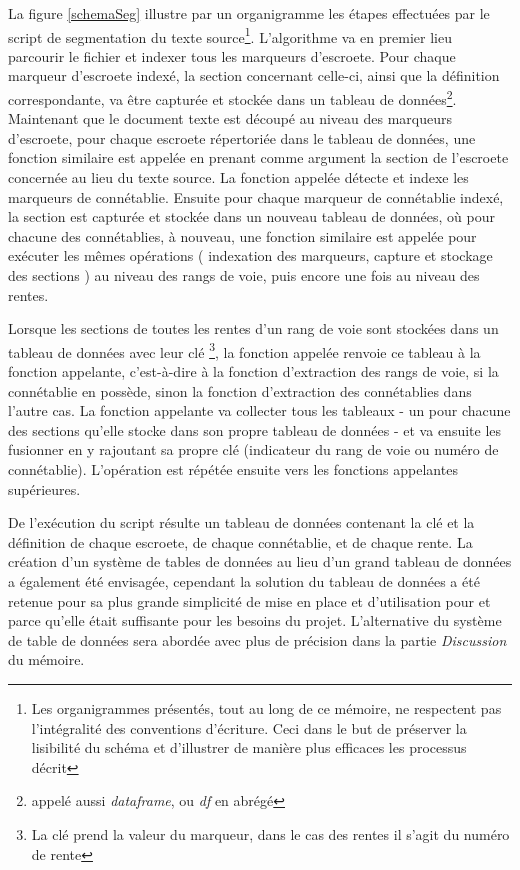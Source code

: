 La figure \ref{schemaSeg} illustre par un organigramme les étapes effectuées par le script de segmentation du texte source\footnote{Les organigrammes présentés, tout au long de ce mémoire, ne respectent pas l'intégralité des conventions d'écriture. Ceci dans le but de préserver la lisibilité du schéma et d'illustrer de manière plus efficaces les processus décrit}.
L’algorithme va en premier lieu parcourir le fichier et indexer tous les marqueurs d'escroete. Pour chaque marqueur d'escroete indexé, la section concernant celle-ci, ainsi que la définition correspondante, va être capturée et stockée dans un tableau de données\footnote{appelé aussi \textit{dataframe}, ou \textit{df} en abrégé}. Maintenant que le document texte est découpé au niveau des marqueurs d'escroete, pour chaque escroete répertoriée dans le tableau de données, une fonction similaire est appelée  en prenant comme argument la section de l'escroete concernée au lieu du texte source.
La fonction appelée détecte et indexe les marqueurs de connétablie. 
Ensuite pour chaque marqueur de connétablie indexé, la section est capturée et stockée dans un nouveau tableau de données, où pour chacune des connétablies, à nouveau, une fonction similaire est appelée pour exécuter les mêmes opérations ( indexation des marqueurs, capture et stockage des sections ) au niveau des rangs de voie, puis encore une fois au niveau des rentes.

Lorsque les sections de toutes les rentes d'un rang de voie sont stockées dans un tableau de données avec leur clé
\footnote{La clé prend la valeur du marqueur, dans le cas des rentes il s'agit du numéro de rente}, 
la fonction appelée renvoie ce tableau à la fonction appelante, c’est-à-dire à la fonction d'extraction des rangs de voie, si la connétablie en possède, sinon la fonction d'extraction des connétablies dans l'autre cas. La fonction appelante va collecter tous les tableaux - un pour chacune des sections qu'elle stocke dans son propre tableau de données - et va ensuite les fusionner en y rajoutant sa propre clé (indicateur du rang de voie ou numéro de connétablie). L'opération est répétée ensuite vers les fonctions appelantes supérieures.

De l'exécution du script résulte un tableau de données contenant la clé et la définition de chaque escroete, de chaque connétablie, et de chaque rente. La création d'un système de tables de données au lieu d'un grand tableau de données a également été envisagée, cependant la solution du tableau de données a été retenue pour sa plus grande simplicité de mise en place et d'utilisation pour et parce qu'elle était suffisante pour les besoins du projet. L'alternative du système de table de données sera abordée avec plus de précision  dans la partie \textit{Discussion} du mémoire.


